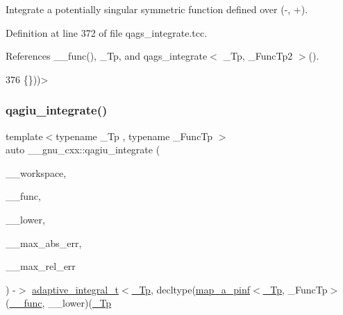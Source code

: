 Integrate a potentially singular symmetric function defined over (-\/, +). 

Definition at line 372 of file qags\+\_\+integrate.\+tcc.



References \+\_\+\+\_\+func(), \+\_\+\+Tp, and qags\+\_\+integrate$<$ \+\_\+\+Tp, \+\_\+\+Func\+Tp2 $>$().


\begin{DoxyCode}
376                                                                                      \{\}))>
\end{DoxyCode}
\mbox{\label{namespace____gnu__cxx_acd07d4a9a1757bea02df44089a2a96bf}} 
\subsubsection{\texorpdfstring{qagiu\+\_\+integrate()}{qagiu\_integrate()}}
{\footnotesize\ttfamily template$<$typename \+\_\+\+Tp , typename \+\_\+\+Func\+Tp $>$ \\
auto \+\_\+\+\_\+gnu\+\_\+cxx\+::qagiu\+\_\+integrate (\begin{DoxyParamCaption}\item[{\hyperlink{class____gnu__cxx_1_1integration__workspace}{integration\+\_\+workspace}$<$ \hyperlink{namespace____gnu__cxx_a3b19a9c800ca194374ef9172290f7d79}{\+\_\+\+Tp}, std\+::invoke\+\_\+result\+\_\+t$<$ \+\_\+\+Func\+Tp, \hyperlink{namespace____gnu__cxx_a3b19a9c800ca194374ef9172290f7d79}{\+\_\+\+Tp} $>$$>$ \&}]{\+\_\+\+\_\+workspace,  }\item[{\+\_\+\+Func\+Tp}]{\+\_\+\+\_\+func,  }\item[{\hyperlink{namespace____gnu__cxx_a3b19a9c800ca194374ef9172290f7d79}{\+\_\+\+Tp}}]{\+\_\+\+\_\+lower,  }\item[{\hyperlink{namespace____gnu__cxx_a3b19a9c800ca194374ef9172290f7d79}{\+\_\+\+Tp}}]{\+\_\+\+\_\+max\+\_\+abs\+\_\+err,  }\item[{\hyperlink{namespace____gnu__cxx_a3b19a9c800ca194374ef9172290f7d79}{\+\_\+\+Tp}}]{\+\_\+\+\_\+max\+\_\+rel\+\_\+err }\end{DoxyParamCaption}) -\/$>$ \hyperlink{struct____gnu__cxx_1_1adaptive__integral__t}{adaptive\+\_\+integral\+\_\+t}$<$\hyperlink{namespace____gnu__cxx_a3b19a9c800ca194374ef9172290f7d79}{\+\_\+\+Tp}, decltype(\hyperlink{struct____gnu__cxx_1_1map__a__pinf}{map\+\_\+a\+\_\+pinf}$<$\hyperlink{namespace____gnu__cxx_a3b19a9c800ca194374ef9172290f7d79}{\+\_\+\+Tp}, \+\_\+\+Func\+Tp$>$(\hyperlink{namespace____gnu__cxx_af2b2f0c7a2ae72b922b1afefae5a65b2}{\+\_\+\+\_\+func}, \+\_\+\+\_\+lower)(\hyperlink{namespace____gnu__cxx_a3b19a9c800ca194374ef9172290f7d79}{\+\_\+\+Tp}}

